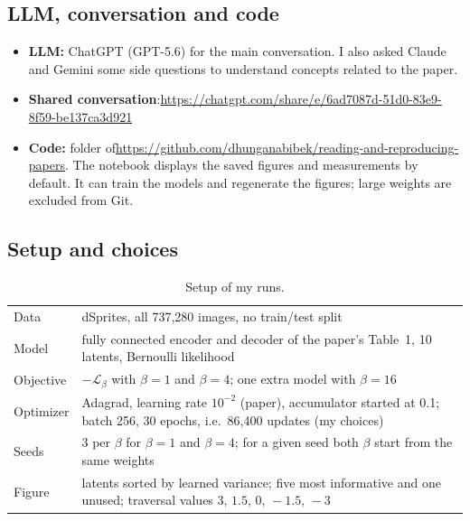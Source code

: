 \subsection{LLM, conversation and code}
\begin{itemize}
  \item \textbf{LLM:} ChatGPT (GPT-5.6) for the main conversation. I also asked Claude and Gemini some side questions to understand concepts related to the paper.
  \item \textbf{Shared conversation}:\newline \url{https://chatgpt.com/share/e/6ad7087d-51d0-83e9-8f59-be137ca3d921}
  \item \textbf{Code:} folder  of\newline \url{https://github.com/dhunganabibek/reading-and-reproducing-papers}. The notebook  displays the saved figures and measurements by default. It can train the models and regenerate the figures; large weights are excluded from Git.
\end{itemize}

\subsection{Setup and choices}
\begin{table}[H]\centering\small
  \begin{tabular}{@{}l@{\quad}p{}@{}}
    \toprule
    Data & dSprites, all 737{,}280 images, no train/test split\\
    Model & fully connected encoder and decoder of the paper's Table~1, 10 latents, Bernoulli likelihood\\
    Objective & $-\mathcal L_\beta$ with $\beta=1$ and $\beta=4$; one extra model with $\beta=16$\\
    Optimizer & Adagrad, learning rate $10^{-2}$ (paper), accumulator started at 0.1; batch 256, 30 epochs, i.e.\ 86{,}400 updates (my choices)\\
    Seeds & 3 per $\beta$ for $\beta=1$ and $\beta=4$; for a given seed both $\beta$ start from the same weights\\
    Figure & latents sorted by learned variance; five most informative and one unused; traversal values $3,\,1.5,\,0,\,-1.5,\,-3$\\
    \bottomrule
  \end{tabular}
  \caption{Setup of my runs.}
\end{table}

